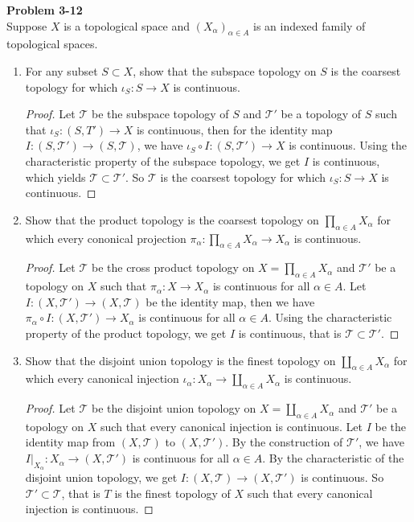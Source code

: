 \documentclass[12pt, a4paper]{article}
\theoremstyle{plain}
\newcommand{\T}{\mathcal{T}}
\newenvironment{problem}[2][Problem]
    { \begin{mdframed}[backgroundcolor=gray!20] \textbf{#1 #2} \\}
    {  \end{mdframed}}
\begin{document}
\pagebreak

\begin{problem}{3-12}
Suppose $X$ is a topological space and $(X_\alpha)_{\alpha\in A}$ is an indexed family of topological spaces.
\begin{enumerate}[label=(\alph*)]
\item For any subset $S\subset X$, show that the subspace topology on $S$ is the coarsest topology for which $\iota_S:S\rightarrow X$ is continuous.
	\begin{proof}
	Let $\T$ be the subspace topology of $S$ and $\T'$ be a topology of $S$ such that $\iota_S:(S,T')\rightarrow X$ is continuous, then for the identity map $I:(S,\T')\rightarrow (S,\T)$, we have $\iota_S\circ I:(S,\T')\rightarrow X$ is continuous. Using the characteristic property of the subspace topology, we get $I$ is continuous, which yields $\T\subset \T'$. So $\T$ is the coarsest topology for which $\iota_S:S\rightarrow X$ is continuous.
	\end{proof}
	
\item Show that the product topology is the coarsest topology on $\prod_{\alpha\in A}X_\alpha$ for which every cononical projection $\pi_\alpha:\prod_{\alpha\in A}X_\alpha\rightarrow X_\alpha$ is continuous.
	\begin{proof}
	Let $\T$ be the cross product topology on $X=\prod_{\alpha\in A}X_\alpha$ and $\T'$ be a topology on $X$ such that $\pi_\alpha:X\rightarrow X_\alpha$ is continuous for all $\alpha\in A$. Let $I: (X,\T')\rightarrow (X,\T)$ be the identity map, then we have $\pi_\alpha\circ I: (X,\T')\rightarrow X_\alpha$ is continuous for all $\alpha\in A$. Using the characteristic property of the product topology, we get $I$ is continuous, that is $\T\subset \T'$.
	\end{proof}

\item Show that the disjoint union topology is the finest topology on $\coprod_{\alpha\in A}X_\alpha$ for which every canonical injection $\iota_\alpha:X_\alpha\rightarrow\coprod_{\alpha\in A} X_\alpha$ is continuous.
	\begin{proof}
	Let $\T$ be the disjoint union topology on $X=\coprod_{\alpha\in A}X_\alpha$ and $\T'$ be a topology on $X$ such that every canonical injection is continuous. Let $I$ be the identity map from $(X,\T)$ to $(X,\T')$. By the construction of $\T'$, we have $I|_{X_\alpha}:X_\alpha\rightarrow (X,\T')$ is continuous for all $\alpha\in A$. By the characteristic of the disjoint union topology, we get $I:(X,\T)\rightarrow (X,\T')$ is continuous. So $\T'\subset \T$, that is $T$ is the finest topology of $X$ such that every canonical injection is continuous.
	\end{proof}


\end{enumerate}
\end{problem}
\end{document}
